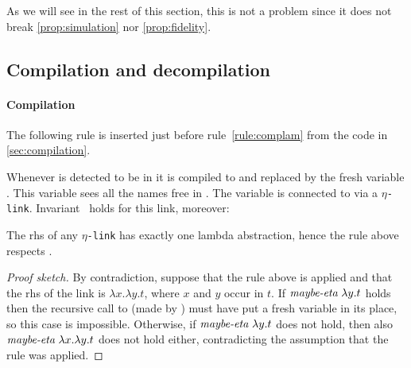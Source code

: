 \documentclass[sigconf,natbib=false,review]{acmart}
\newcommand{\appsep}{\ensuremath{\textcolor{lightgray}{\cdot}}}
\newcommand{\linkMacro}[1]{\ensuremath{#1}\texttt{-link}\xspace}
\newcommand{\linketa} {\linkMacro{\eta}}
\newcommand{\Ho}{\texorpdfstring{\ensuremath{\mathcal{H}_o}\xspace}{Ho}}
\newcommand{\rhs}{rhs\xspace}
\begin{document}
As we will see in the rest of this section, this is not a problem
since it does not break
\cref{prop:simulation} nor \cref{prop:fidelity}.


% 


\subsection{Compilation and decompilation}\label{sec:etacomp}


\paragraph{Compilation}
The following rule is inserted just before rule~\ref{rule:complam} from the code in
\cref{sec:compilation}.



\noindent
Whenever  is detected to be in
\maybeeta it is compiled to  and replaced by the fresh
variable . This variable sees all the names free in
. The variable is connected to  via a \linketa.
Invariant~ holds for this link, moreover:

\begin{corollary}
  The \rhs of any \linketa has exactly one lambda abstraction, hence
  the rule above respects .
  \label{cor:rhs-eta-onelamb}
\end{corollary}

\begin{proof}[Proof sketch]
  By contradiction, suppose that the rule above is applied and that
  the \rhs of the link is $\lambda x.\lambda y.t$, where $x$ and $y$ occur in $t$.
  If $\emph{maybe-eta}{}~\lambda y.t$ holds then the recursive call to
   (made by ) must have put a fresh variable
  in its place, so this case is impossible.
  Otherwise, if $\emph{maybe-eta}{}~\lambda y.t$ does not hold, then also
  $\emph{maybe-eta}{}~\lambda x.\lambda y.t$ does not hold either, contradicting
  the assumption that the rule was applied.
\end{proof}
\end{document}
